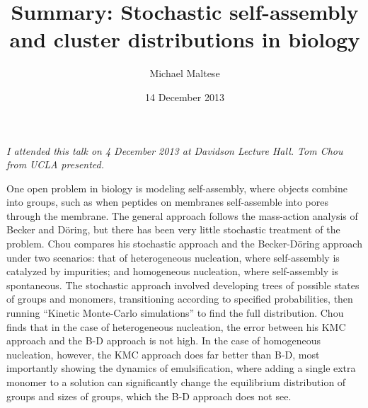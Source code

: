 \documentclass[12pt]{article}
\title{\textbf{Summary: Stochastic self-assembly and cluster distributions in biology}}
\author{Michael Maltese}
\date{14 December 2013}
\begin{document}
\maketitle

\emph{I attended this talk on 4 December 2013 at Davidson Lecture Hall. Tom Chou from UCLA presented.}

One open problem in biology is modeling self-assembly, where objects combine into groups, such as when peptides on membranes self-assemble into pores through the membrane. The general approach follows the mass-action analysis of Becker and D\"oring, but there has been very little stochastic treatment of the problem. Chou compares his stochastic approach and the Becker-D\"oring approach under two scenarios: that of heterogeneous nucleation, where self-assembly is catalyzed by impurities; and homogeneous nucleation, where self-assembly is spontaneous. The stochastic approach involved developing trees of possible states of groups and monomers, transitioning according to specified probabilities, then running ``Kinetic Monte-Carlo simulations'' to find the full distribution. Chou finds that in the case of heterogeneous nucleation, the error between his KMC approach and the B-D approach is not high. In the case of homogeneous nucleation, however, the KMC approach does far better than B-D, most importantly showing the dynamics of emulsification, where adding a single extra monomer to a solution can significantly change the equilibrium distribution of groups and sizes of groups, which the B-D approach does not see.
\end{document}
